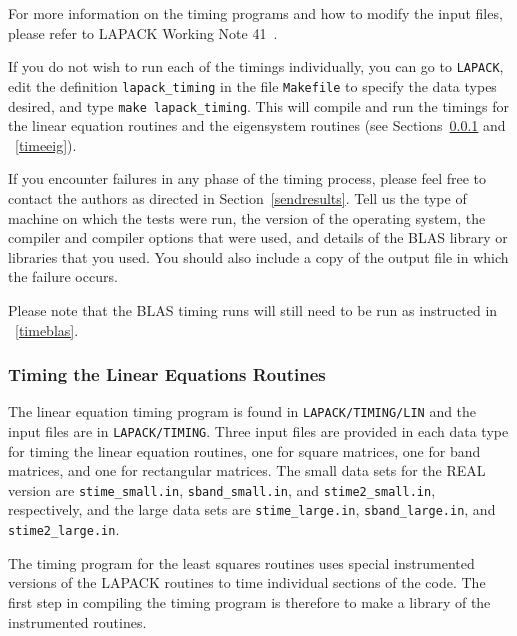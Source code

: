 \documentclass[11pt]{report}
\begin{document}
For more information on the timing programs and how to modify the
input files, please refer to LAPACK Working Note 41~\cite{WN41}.

If you do not wish to run each of the timings individually, you can
go to \texttt{LAPACK}, edit the definition \texttt{lapack\_timing} in the file
\texttt{Makefile} to specify the data types desired, and type \texttt{make
lapack\_timing}.  This will compile
and run the timings for the linear equation routines and the eigensystem
routines (see Sections~\ref{timelin} and ~\ref{timeeig}). 


If you encounter failures in any phase of the timing process, please
feel free to contact the authors as directed in Section~\ref{sendresults}.
Tell us the 
type of machine on which the tests were run, the version of the operating
system, the compiler and compiler options that were used,
and details of the BLAS library or libraries that you used.  You should
also include a copy of the output file in which the failure occurs.

Please note that the BLAS
timing runs will still need to be run as instructed in ~\ref{timeblas}.

\subsubsection{Timing the Linear Equations Routines}\label{timelin}

The linear equation timing program is found in \texttt{LAPACK/TIMING/LIN}
and the input files are in \texttt{LAPACK/TIMING}.
Three input files are provided in each data type for timing the
linear equation routines, one for square matrices, one for band
matrices, and one for rectangular matrices.  The small data sets for the REAL version
are \texttt{stime\_small.in}, \texttt{sband\_small.in}, and \texttt{stime2\_small.in}, respectively,
and the large data sets are
\texttt{stime\_large.in}, \texttt{sband\_large.in}, and \texttt{stime2\_large.in}.

The timing program for the least squares routines uses special instrumented
versions of the LAPACK routines to time individual sections of the code.
The first step in compiling the timing program is therefore to make a library
of the instrumented routines.
\end{document}

